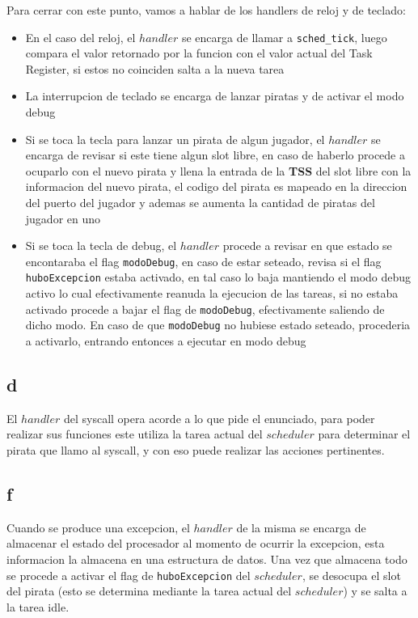 Para cerrar con este punto, vamos a hablar de los handlers de reloj y de teclado:

\begin{itemize}
	\item En el caso del reloj, el $handler$ se encarga de llamar a \texttt{sched\_tick}, luego compara el valor retornado por la funcion con el valor actual del Task Register, si estos no coinciden salta a la nueva tarea
	\item La interrupcion de teclado se encarga de lanzar piratas y de activar el modo debug
	\item Si se toca la tecla para lanzar un pirata de algun jugador, el $handler$ se encarga de revisar si este tiene algun slot libre, en caso de haberlo procede a ocuparlo con el nuevo pirata y llena la entrada de la \textbf{TSS} del slot libre con la informacion del nuevo pirata, el codigo del pirata es mapeado en la direccion del puerto del jugador y ademas se aumenta la cantidad de piratas del jugador en uno
	\item Si se toca la tecla de debug, el $handler$ procede a revisar en que estado se encontaraba el flag \texttt{modoDebug}, en caso de estar seteado, revisa si el flag \texttt{huboExcepcion} estaba activado, en tal caso lo baja mantiendo el modo debug activo lo cual efectivamente reanuda la ejecucion de las tareas, si no estaba activado procede a bajar el flag de \texttt{modoDebug}, efectivamente saliendo de dicho modo. En caso de que \texttt{modoDebug} no hubiese estado seteado, procederia a activarlo, entrando entonces a ejecutar en modo debug
\end{itemize}
	
\subsection{d}

El $handler$ del syscall opera acorde a lo que pide el enunciado, para poder realizar sus funciones este utiliza la tarea actual del $scheduler$ para determinar el pirata que llamo al syscall, y con eso puede realizar las acciones pertinentes.

\subsection{f}

Cuando se produce una excepcion, el $handler$ de la misma se encarga de almacenar el estado del procesador al momento de ocurrir la excepcion, esta informacion la almacena en una estructura de datos. Una vez que almacena todo se procede a activar el flag de \texttt{huboExcepcion} del $scheduler$, se desocupa el slot del pirata (esto se determina mediante la tarea actual del $scheduler$) y se salta a la tarea idle.